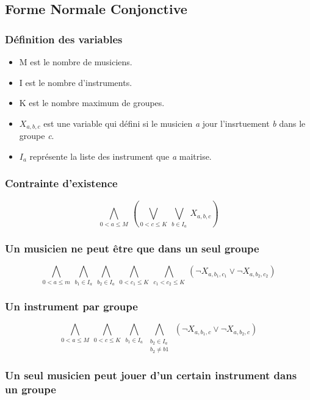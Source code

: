 \documentclass[11pt]{article}
\begin{document}
\subsection{Forme Normale Conjonctive}

\subsubsection{Définition des variables}

\begin{itemize}
\item M est le nombre de musiciens.
\item I est le nombre d'instruments.
\item K est le nombre maximum de groupes.
\item $X_{a,b,c}$ est une variable qui défini si le musicien \textit{a} jour l'insrtuement \textit{b} dans le groupe \textit{c}.
\item $I_a$ représente la liste des instrument que \textit{a} maitrise.
\end{itemize}

\subsubsection{Contrainte d'existence}

$$\bigwedge\limits_{0<a\le M}\ \left(\bigvee\limits_{0<c\le K}\ \bigvee\limits_{b\in I_a}\ X_{a,b,c}\right)$$

\subsubsection{Un musicien ne peut être que dans un seul groupe}

$$\bigwedge\limits_{0<a\le m}\ \bigwedge\limits_{b_1\in I_a}\ \bigwedge\limits_{b_2\in I_a}\ \bigwedge\limits_{0<c_1\le K}\ \bigwedge\limits_{c_1<c_2\le K}\ \left(\neg X_{a,b_1,c_1} \vee \neg X_{a,b_2,c_2}\right)$$

\subsubsection{Un instrument par groupe}

$$\bigwedge\limits_{0<a\le M}\ \bigwedge\limits_{0<c\le K}\ \bigwedge\limits_{b_1\in I_a}\ \bigwedge\limits_{\substack{b_2\in I_a \\ b_2 \ne b1}}\ \left(\neg X_{a,b_1,c} \vee \neg X_{a,b_2,c}\right)$$

\subsubsection{Un seul musicien peut jouer d'un certain instrument dans un groupe}
\end{document}
